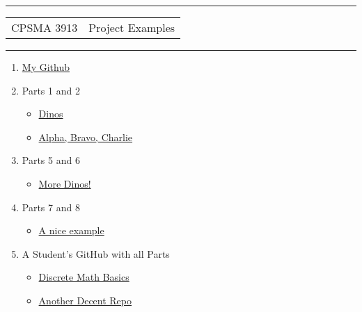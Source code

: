 \documentclass[11pt]{article}
\begin{document}
\newcommand{\dsp}{\displaystyle}
\newcommand{\ihat}{{\bf{i}}}
\newcommand{\jhat}{{\bf{j}}}
\newcommand{\khat}{{\bf{k}}}
\newcommand{\Fhat}{{\bf{F}}}
\newcommand{\ww}{{\bf{WeBWorK }}}
\newcommand{\pr}{{\bf{Project}}}

\thispagestyle{empty}

\noindent
\sffamily
\begin{center}
\rule{7.5in}{2pt}

\vspace{.2in}

\begin{tabular}{p{4in}p{4in}}
CPSMA 3913

&

Project Examples


\end{tabular}
\rule{7.5in}{2pt}

\vspace{.1in}

\end{center}

\begin{enumerate}

\item \href{https://github.com/nurfnick/Discrete\_Math}{My Github}
\item Parts 1 and 2 
\begin{itemize}
\item \href{https://github.com/JDestroyer5/Discrete\_Mathmatics/blob/main/Sets\%20and\%20Functions\%20Dinosaurs.ipynb}{Dinos}
\item \href{https://colab.research.google.com/github/samnmil76/Discrete\_Math/blob/master/ProjectPart1.ipynb}{Alpha, Bravo, Charlie}
\end{itemize}
\item Parts 5 and 6
\begin{itemize}
\item \href{https://github.com/JDestroyer5/Discrete_Mathmatics/tree/main}{More Dinos!}
\end{itemize}
\item Parts 7 and 8
\begin{itemize}
\item \href{https://github.com/samnmil76/Discrete_Math/blob/master/ProjectPart4.ipynb}{A nice example}
\end{itemize}
\item A Student's GitHub with all Parts
\begin{itemize}
\item \href{https://github.com/sovikapoudel/discrete-math-basics}{Discrete Math Basics}
\item \href{https://github.com/ashpou1/discrete-math}{Another Decent Repo}
\end{itemize}
\end{enumerate}
\end{document}
